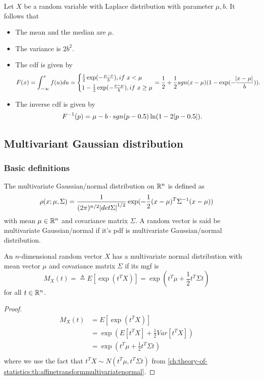 \begin{refsection}
\begin{lemma}\label{ch:theory-of-statistics:th:PropertiesOfLaplaceDistribution}
Let $X$ be a random variable with Laplace distribution with parameter $\mu,b$. 
It follows that
\begin{itemize}
	\item The mean and the median are $\mu$.
	\item The variance is $2b^2$.
	\item The cdf is given by
	$$F(x) = \int_{-\infty}^{x} f(u) du =\begin{cases*}
	\frac{1}{2}\exp(-\frac{\mu-x}{b}), if~x<\mu \\
	1-\frac{1}{2}\exp(-\frac{x-\mu}{b}), if~x\geq \mu \\
	\end{cases*} = \frac{1}{2} + \frac{1}{2}sgn(x-\mu)(1 - \exp(-\frac{\abs{x-\mu}}{b})).$$
	\item The inverse cdf is given by
	$$F^{-1}(p) = \mu - b\cdot sgn(p-0.5)\ln(1-2\abs{p-0.5}).$$
\end{itemize}	
\end{lemma}

\subsection{Multivariant Gaussian distribution}
\subsubsection{Basic definitions}
\begin{definition}\cite[180]{hoggintroduction}
	\cite[40]{chirikjian2011stochastic1}The multivariate Gaussian/normal distribution on $\mathbb{R}^n$ is defined as
	$$\rho(x;\mu,\Sigma) = \frac{1}{(2\pi)^{n/2}\abs{det \Sigma}^{1/2}}\exp(-\frac{1}{2}(x-\mu)^T\Sigma^{-1}(x-\mu))$$
	with mean $\mu \in \mathbb{R}^n$ and covariance matrix $\Sigma$.
	A random vector is said be multivariate Gaussian/normal if it's pdf is multivariate Gaussian/normal distribution.
\end{definition}

\begin{lemma}\label{ch:theory-of-statistics:th:multivariateGaussianMGF}\cite[181]{hoggintroduction}
An $n$-dimensional random vector $X$ has a multivariate normal distribution with mean vector $\mu$ and covariance matrix $\Sigma$ if its mgf is
$$M_X(t) = \triangleq E[\exp(t^TX)] = \exp(t^T\mu + \frac{1}{2}t^T\Sigma t)$$
for all $t\in \mathbb{R}^n$.
\end{lemma}
\begin{proof}
\begin{align*}
M_X(t) &= E[\exp(t^TX)] \\
& = \exp(E[t^TX] + \frac{1}{2}Var[t^TX]) \\
& = \exp(t^T\mu + \frac{1}{2}t^T\Sigma t) \\
\end{align*}
where we use the fact that $t^TX\sim N(t^T \mu, t^T\Sigma t)$ from \autoref{ch:theory-of-statistics:th:affinetransformmultivariatenormal}.
\end{proof}


\end{refsection}
